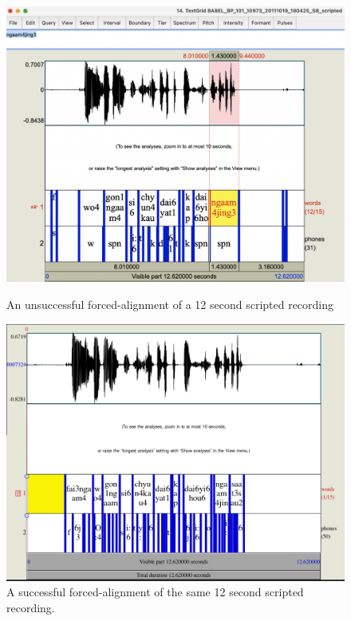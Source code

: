 \documentclass[11pt]{article}
\begin{document}
\begin{figure}[h]
\begin{minipage}[t]{.45\linewidth}
\includegraphics[width=\linewidth]{nonaligned.png}
\caption{An unsuccessful forced-alignment of a 12 second scripted recording} 
\end{minipage}\hfill
\begin{minipage}[b]{.45\linewidth}
\includegraphics[width=\linewidth]{aligned.png}
\caption{A successful forced-alignment of the same 12 second scripted recording.} 
\end{minipage}
\end{figure}
\end{document}
